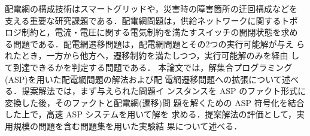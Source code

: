 配電網の構成技術はスマートグリッドや，災害時の障害箇所の迂回構成などを
支える重要な研究課題である．配電網問題は，供給ネットワークに関するトポ
ロジ制約と，電流・電圧に関する電気制約を満たすスイッチの開閉状態を求め
る問題である．配電網遷移問題は，配電網問題とその2つの実行可能解が与え
られたとき，一方から他方へ，遷移制約を満たしつつ，実行可能解のみを経由
して到達できるかを判定する問題である．
%
本論文では，解集合プログラミング(ASP)を用いた配電網問題の解法および配
電網遷移問題への拡張について述べる．提案解法では，まず与えられた問題イ
ンスタンスを ASP のファクト形式に変換した後，そのファクトと配電網(遷移)問
題を解くための ASP 符号化を結合した上で，高速 ASP システムを用いて解を
求める．提案解法の評価として，実用規模の問題を含む問題集を用いた実験結
果について述べる．


